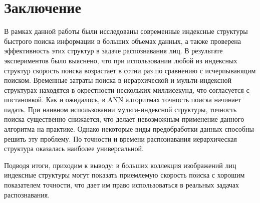 \section*{Заключение}
\label{sec:Chapter5} 
В рамках данной работы были исследованы современные индексные структуры быстрого поиска информации в больших объемах данных, а также проверена эффективность этих структур в задаче распознавания лиц. В результате экспериментов было выяснено, что при использовании любой из индексных структур скорость поиска возрастает в сотни раз по сравнению с исчерпывающим поиском. Временные затраты поиска в иерархической и мульти-индексной структурах находятся в окрестности нескольких миллисекунд, что согласуется с постановкой. Как и ожидалось, в ANN алгоритмах точность поиска начинает падать. При наивном использовании мульти-индексной структуры, точность поиска существенно снижается, что делает невозможным применение данного алгоритма на практике. Однако некоторые виды предобработки данных способны решить эту проблему. По точности и времени распознавания иерархическая структура оказалась наиболее универсальной.

Подводя итоги, приходим к выводу: в больших коллекция изображений лиц индексные структуры могут показать приемлемую скорость поиска с хорошим показателем точности, что дает им право использоваться в реальных задачах распознавания.